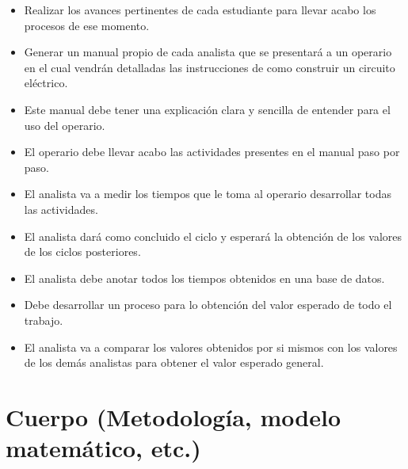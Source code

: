     \begin{itemize}
        \item Realizar los avances pertinentes de cada estudiante para llevar acabo los procesos de ese momento.
        \item Generar un manual propio de cada analista que se presentará a un operario en el cual vendrán detalladas las instrucciones de como construir un circuito eléctrico.
        \item Este manual debe tener una explicación clara y sencilla de entender para el uso del operario.
        \item El operario debe llevar acabo las actividades presentes en el manual paso por paso.
        \item El analista va a medir los tiempos que le toma al operario desarrollar todas las actividades.
        \item El analista dará como concluido el ciclo y esperará la obtención de los valores de los ciclos posteriores.
        \item El analista debe anotar todos los tiempos obtenidos en una base de datos.
        \item Debe desarrollar un proceso para lo obtención del valor esperado de todo el trabajo.
        \item El analista va a comparar los valores obtenidos por si mismos con los valores de los demás analistas para obtener el valor esperado general.
    \end{itemize}
    
    \section{Cuerpo (Metodología, modelo matemático, etc.)}
    
    
